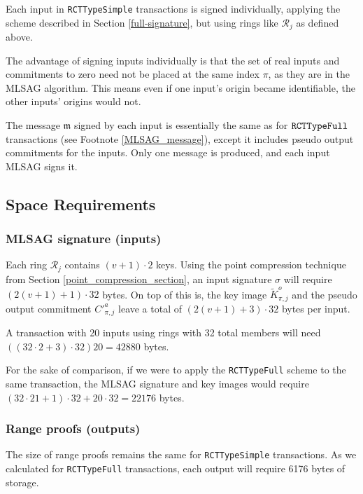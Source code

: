 Each input in {\tt RCTTypeSimple} transactions is signed individually, applying the scheme described in Section \ref{full-signature}, but using rings like \(\mathcal{R}_j\) as defined above.

The advantage of signing inputs individually is that the set of real inputs and commitments to zero need not be placed at the same index $\pi$, as they are in the MLSAG algorithm. This means even if one input's origin became identifiable, the other inputs' origins would not.

The message $\mathfrak{m}$ signed by each input is essentially the same as for $\tt RCTTypeFull$ transactions (see Footnote \ref{MLSAG_message}), except it includes pseudo output commitments for the inputs. Only one message is produced, and each input MLSAG signs it.


\subsection{Space Requirements}

\subsubsection*{MLSAG signature (inputs)}

Each ring \(\mathcal{R}_j\) contains \((v+1) \cdot 2\) keys. Using the point compression technique from Section \ref{point_compression_section}, an input signature $\sigma$ will require \( (2(v+1) + 1) \cdot 32  \) bytes. On top of this is, the key image $\tilde{K}^o_{\pi,j}$ and the pseudo output commitment $C'^a_{\pi,j}$ leave a total of $(2(v+1)+3) \cdot 32$ bytes per input.

A transaction with 20 inputs using rings with 32 total members will need \(((32 \cdot 2 + 3) \cdot 32) 20 = 42880 \) bytes.

For the sake of comparison, if we were to apply the {\tt RCTTypeFull} scheme to the same transaction, the MLSAG signature and key images would require \(( 32 \cdot 21 + 1) \cdot 32 + 20 \cdot 32 = 22176\) bytes.


\subsubsection*{Range proofs (outputs)}

The size of range proofs remains the same for {\tt RCTTypeSimple} transactions. As we calculated for {\tt RCTTypeFull} transactions, each output will require 6176 bytes of storage.



